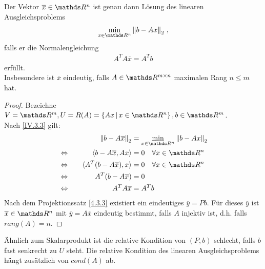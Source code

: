 \begin{Satze}
  Der Vektor $\overline{x} \in\R^n$ ist genau dann Lösung des linearen Ausgleichsproblems
  \begin{gather*}
    \min_{x\in\Ren} \nn[b-Ax]_2 \, ,
  \end{gather*}
  falls er die Normalengleichung
  \begin{gather}
    A^TA\overline{x} = A^Tb
    \label{IV.3.6}
  \end{gather}
  erfüllt. \\
  Insbesondere ist $\overline{x}$ eindeutig,
  falls $A\in \R^{m\times n}$ maximalen Rang $n\leq m$ hat.
\end{Satze}

\begin{proof} Bezeichne
  $V= \R^m, U= R(A) = \left\{Ax \, \middle|  \, x \in\Ren \right\}, b \in \R^m$.\\
  Nach \eqref{IV.3.3} gilt:
  \begin{alignat*}{2}
    &&\nn[b-A\overline{x}]_2 &= \min_{x\in\Ren} \nn[b-Ax]_2 \\
    &\Leftrightarrow \quad & \scp{b-A \overline{x}}{Ax} &= 0 \quad \forall x\in \Ren \\
    &\Leftrightarrow & \scp{A^T(b-A\overline{x})}{x} &= 0 \quad  \forall x\in\Ren \\
    &\Leftrightarrow & A^T(b-A\overline{x}) &= 0 \\
    &\Leftrightarrow & A^TA\overline{x} &= A^Tb
  \end{alignat*}
  Nach dem Projektionssatz \ref{4.3.3} existiert ein eindeutiges
  $\overline{y} = P b$.
  Für dieses $\overline{y}$ ist $\overline{x}\in \Ren $ mit $\overline{y} = A\overline{x}$
  eindeutig bestimmt, falls $A$ injektiv ist, d.h. falls $rang(A) = n$. 
\end{proof}

Ähnlich zum Skalarprodukt ist die relative Kondition von $(P,b) $ schlecht, 
falls $b$ fast senkrecht zu $U$ steht.
Die relative Kondition des linearen Ausgleichsproblems hängt zusätzlich von $cond(A)$ ab.


